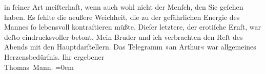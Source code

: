 \begin{ledgroupsized}[t]{13cm}
                    in ſeiner Art meiſter{\pb}haft, wenn auch
                    wohl nicht der Menſch, den Sie geſehen haben. Es fehlte die aeußere Weichheit,
                    die zu der gefährlichen Energie des Mannes ſo lebensvoll kontraſtieren müßte.
                    Dieſer letztere, der erotiſche Ernſt, war deſto eindrucksvoller betont. Mein Bruder und ich verbrachten
                    den Reſt des Abends \introOben{}mit\introOben{} den Hauptdarſtellern. Das
                    Telegramm »an Arthur« war allgemeines Herzensbedürfnis.\pend
           \pstart
           Ihr ergebener{\\[\baselineskip]}\spacefill\mbox{Thomas Mann.}\pend
           \leftskip=0em{}\endnumbering{}\end{ledgroupsized}  \newcommand{\dateiname}{L02039}\newcommand{\titel}{Thomas Mann an Arthur Schnitzler, 16. 10. 1911}\newcommand{\editorInnen}{Martin Anton Müller und Gerd-Hermann Susen}
            \footnotesize
\begin{ledgroupsized}[t]{11.5cm}
\end{ledgroupsized}
         
      
